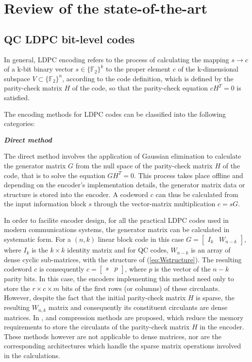 \section{Review of the state-of-the-art}
\label{sec:related-work}
\subsection{QC LDPC bit-level codes}
In general, LDPC encoding refers to the process of calculating the mapping $s \rightarrow c$ of a k-bit binary vector $s\in\{\mathbb{F}_2\}^k$ to the proper element $c$ of the k-dimensional subspace $V\subset\{\mathbb{F}_2\}^n$, according to the code definition, which is defined by the parity-check matrix $H$ of the code, so that the parity-check equation $ cH^{T}=0 $ is satisfied.\par
The encoding methods for LDPC codes can be classified into the following categories:\par
\textbf{\textit{Direct method}}\par
The direct method involves the application of Gaussian elimination to calculate the generator matrix $G$ from the null space of the parity-check matrix $H$ of the code, that is to solve the equation $GH^{T}=0 $. This process takes place offline and depending on the encoder's implementation details, the generator matrix data or structure is stored into the encoder. A codeword $c$ can thus be calculated from the input information block $s$ through the vector-matrix multiplication $c=sG$.\par
In order to facilite encoder design, for all the practical LDPC codes used in modern communications systems, the generator matrix can be calculated in systematic form. For a $(n,k)$ linear block code in this case $G=\begin{bmatrix}I_{k} & W_{n-k}\end{bmatrix} $, where $I_{k}$ is the $k\times k$ identity matrix and for QC codes, $W_{n-k}$ is an array of dense cyclic sub-matrices, with the structure of (\ref{eq:Wstructure}). The resulting codeword $c$ is consequently $c=\begin{bmatrix}s & p\end{bmatrix}$, where $p$ is the vector of the $n-k$ parity bits. In this case, the encoders implementing this method need only to store the $r \times c \times m$ bits of the first rows (or columns) of these circulants. However, despite the fact that the initial parity-check matrix $H$ is sparse, the resulting $W_{n,k}$ matrix and consequently its constituent circulants are dense matrices. In \cite{Mahdi2014}, \cite{Wang2008} and \cite{Lee2004} compression methods are proposed, which reduce the memory requirements to store the circulants of the parity-check matrix $H$ in the encoder. These methods however are not applicable to dense matrices, nor are the corresponding architectures which handle the sparse matrix operations involved in the calculations.\par  
